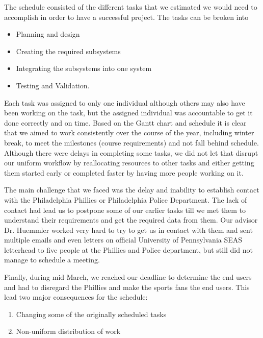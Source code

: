 The schedule consisted of the different tasks that we estimated we would
need to accomplish in order to have a successful project. The tasks
can be broken into

\begin{itemize}
  \item Planning and design
  \item Creating the required subsystems
  \item Integrating the subsystems into one system
  \item Testing and Validation.
\end{itemize}

Each task was assigned to only one individual although others may also have
been working on the task, but the assigned individual was accountable to
get it done correctly and on time. Based on the Gantt chart and
schedule it is clear that we aimed to work consistently over the course
of the year, including winter break, to meet the milestones (course requirements) and not fall behind schedule. Although there were delays in completing some tasks, we did not let that disrupt our uniform workflow by reallocating resources to other tasks and either getting them started early or completed faster by having more people working on it. 

The main challenge that we faced was the delay and inability to establish contact with the Philadelphia Phillies or Philadelphia Police Department. The lack of contact had lead us to postpone some of our earlier tasks till we met them to understand their requirements and get the required data from them. Our advisor Dr. Huemmler worked very hard to try to get us in contact with them and sent multiple emails and even letters on official University of Pennsylvania SEAS letterhead to five people at the Phillies and Police department, but still did not manage to schedule a meeting.

Finally, during mid March, we reached our deadline to determine the end users and had to disregard the Phillies and make the sports fans the end users. This lead two major consequences for the schedule: 

\begin{enumerate}
  \item Changing some of the originally scheduled tasks
  \item Non-uniform distribution of work
\end{enumerate}

